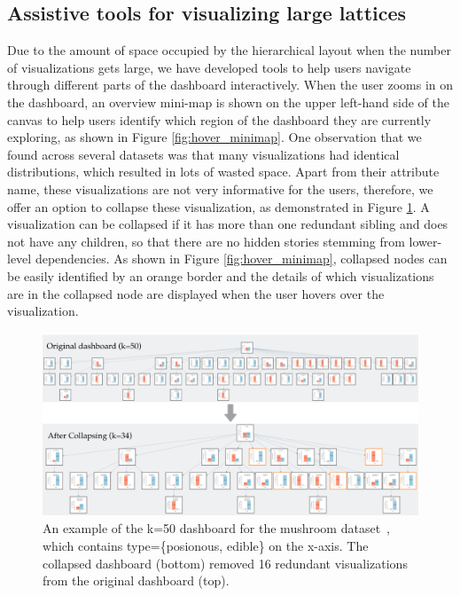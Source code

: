 \subsection{Assistive tools for visualizing large lattices\label{sec:navigation}}
Due to the amount of space occupied by the hierarchical layout when the number of visualizations gets large, we have developed tools to help users navigate through different parts of the dashboard interactively.
  When the user zooms in on the dashboard, an overview mini-map is shown on the upper left-hand side of the canvas to help users identify which region of the dashboard they are currently exploring, as shown in Figure \ref{fig:hover_minimap}.
One observation that we found across several datasets was that many visualizations had identical distributions, which resulted in lots of wasted space. Apart from their attribute name, these visualizations are not very informative for the users, therefore, we offer an option to collapse these visualization, as demonstrated in Figure \ref{fig:collapse_demo}. A visualization can be collapsed if it has more than one redundant sibling and does not have any children, so that there are no hidden stories stemming from lower-level dependencies. As shown in Figure \ref{fig:hover_minimap}, collapsed nodes can be easily identified by an orange border and the details of which visualizations are in the collapsed node are displayed when the user hovers over the visualization.
\begin{figure}[ht!]
\centering
\includegraphics[width=\linewidth]{figures/collapsed_example.png}
\caption{An example of the k=50 dashboard for the mushroom dataset~\cite{mushroom}, which contains type=\{posionous, edible\} on the x-axis. The collapsed dashboard (bottom) removed 16 redundant visualizations from the original dashboard (top).}
\label{fig:collapse_demo}
\end{figure}
